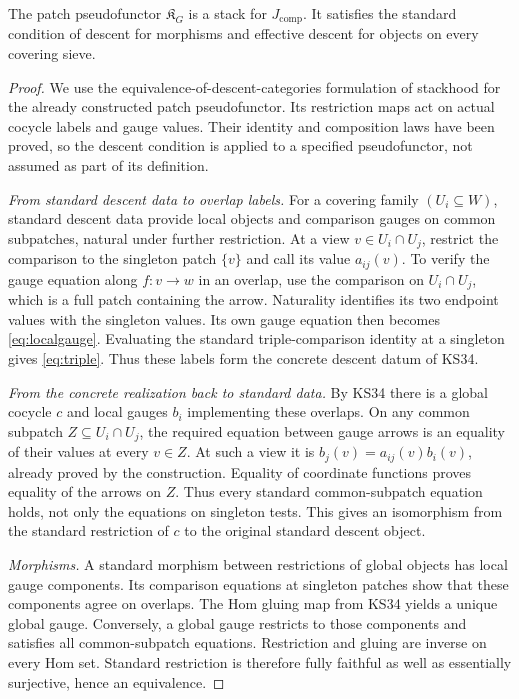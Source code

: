 \begin{theorem}\label{KS36}
The patch pseudofunctor \(\mathfrak K_G\) is a stack for \(J_{\mathrm{comp}}\). It satisfies the standard condition of descent for morphisms and effective descent for objects on every covering sieve.
\end{theorem}
\begin{proof}
We use the equivalence-of-descent-categories formulation of stackhood for the already constructed patch pseudofunctor. Its restriction maps act on actual cocycle labels and gauge values. Their identity and composition laws have been proved, so the descent condition is applied to a specified pseudofunctor, not assumed as part of its definition.

\emph{From standard descent data to overlap labels.} For a covering family $(U_i\subseteq W)$, standard descent data provide local objects and comparison gauges on common subpatches, natural under further restriction. At a view $v\in U_i\cap U_j$, restrict the comparison to the singleton patch $\{v\}$ and call its value $a_{ij}(v)$. To verify the gauge equation along $f:v\to w$ in an overlap, use the comparison on $U_i\cap U_j$, which is a full patch containing the arrow. Naturality identifies its two endpoint values with the singleton values. Its own gauge equation then becomes \eqref{eq:localgauge}. Evaluating the standard triple-comparison identity at a singleton gives \eqref{eq:triple}. Thus these labels form the concrete descent datum of KS34.

\emph{From the concrete realization back to standard data.} By KS34 there is a global cocycle $c$ and local gauges $b_i$ implementing these overlaps. On any common subpatch $Z\subseteq U_i\cap U_j$, the required equation between gauge arrows is an equality of their values at every $v\in Z$. At such a view it is $b_j(v)=a_{ij}(v)b_i(v)$, already proved by the construction. Equality of coordinate functions proves equality of the arrows on $Z$. Thus every standard common-subpatch equation holds, not only the equations on singleton tests. This gives an isomorphism from the standard restriction of $c$ to the original standard descent object.

\emph{Morphisms.} A standard morphism between restrictions of global objects has local gauge components. Its comparison equations at singleton patches show that these components agree on overlaps. The Hom gluing map from KS34 yields a unique global gauge. Conversely, a global gauge restricts to those components and satisfies all common-subpatch equations. Restriction and gluing are inverse on every Hom set. Standard restriction is therefore fully faithful as well as essentially surjective, hence an equivalence.


\end{proof}
